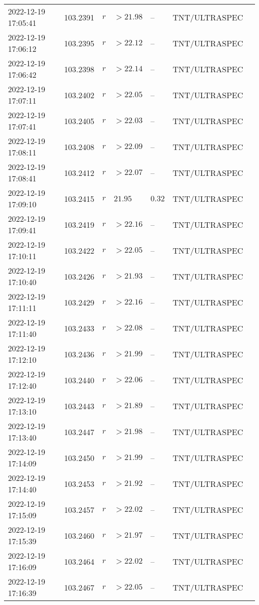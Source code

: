 \documentclass{nature_plusfigure}
\begin{document}
\begin{supplement}
\begin{center}
\begin{longtable}{lllllll}
2022-12-19 17:05:41 & 103.2391 & $r$ & $>21.98$ & -- & TNT/ULTRASPEC &  \\ 
2022-12-19 17:06:12 & 103.2395 & $r$ & $>22.12$ & -- & TNT/ULTRASPEC &  \\ 
2022-12-19 17:06:42 & 103.2398 & $r$ & $>22.14$ & -- & TNT/ULTRASPEC &  \\ 
2022-12-19 17:07:11 & 103.2402 & $r$ & $>22.05$ & -- & TNT/ULTRASPEC &  \\ 
2022-12-19 17:07:41 & 103.2405 & $r$ & $>22.03$ & -- & TNT/ULTRASPEC &  \\ 
2022-12-19 17:08:11 & 103.2408 & $r$ & $>22.09$ & -- & TNT/ULTRASPEC &  \\ 
2022-12-19 17:08:41 & 103.2412 & $r$ & $>22.07$ & -- & TNT/ULTRASPEC &  \\ 
2022-12-19 17:09:10 & 103.2415 & $r$ & $21.95$ & $0.32$ & TNT/ULTRASPEC &  \\ 
2022-12-19 17:09:41 & 103.2419 & $r$ & $>22.16$ & -- & TNT/ULTRASPEC &  \\ 
2022-12-19 17:10:11 & 103.2422 & $r$ & $>22.05$ & -- & TNT/ULTRASPEC &  \\ 
2022-12-19 17:10:40 & 103.2426 & $r$ & $>21.93$ & -- & TNT/ULTRASPEC &  \\ 
2022-12-19 17:11:11 & 103.2429 & $r$ & $>22.16$ & -- & TNT/ULTRASPEC &  \\ 
2022-12-19 17:11:40 & 103.2433 & $r$ & $>22.08$ & -- & TNT/ULTRASPEC &  \\ 
2022-12-19 17:12:10 & 103.2436 & $r$ & $>21.99$ & -- & TNT/ULTRASPEC &  \\ 
2022-12-19 17:12:40 & 103.2440 & $r$ & $>22.06$ & -- & TNT/ULTRASPEC &  \\ 
2022-12-19 17:13:10 & 103.2443 & $r$ & $>21.89$ & -- & TNT/ULTRASPEC &  \\ 
2022-12-19 17:13:40 & 103.2447 & $r$ & $>21.98$ & -- & TNT/ULTRASPEC &  \\ 
2022-12-19 17:14:09 & 103.2450 & $r$ & $>21.99$ & -- & TNT/ULTRASPEC &  \\ 
2022-12-19 17:14:40 & 103.2453 & $r$ & $>21.92$ & -- & TNT/ULTRASPEC &  \\ 
2022-12-19 17:15:09 & 103.2457 & $r$ & $>22.02$ & -- & TNT/ULTRASPEC &  \\ 
2022-12-19 17:15:39 & 103.2460 & $r$ & $>21.97$ & -- & TNT/ULTRASPEC &  \\ 
2022-12-19 17:16:09 & 103.2464 & $r$ & $>22.02$ & -- & TNT/ULTRASPEC &  \\ 
2022-12-19 17:16:39 & 103.2467 & $r$ & $>22.05$ & -- & TNT/ULTRASPEC &  \\ 

\end{longtable}
\end{center}
\end{supplement}
\end{document}

